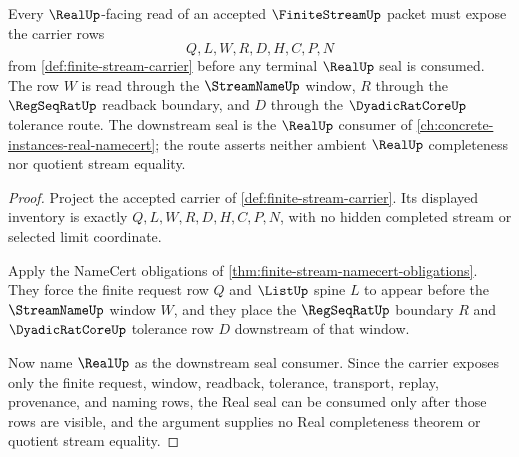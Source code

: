 \begin{theorem}
\label{thm:finite-stream-real-seal-dependency-route}
Every $\RealUp$-facing read of an accepted $\FiniteStreamUp$ packet must expose the carrier rows
$$
Q,L,W,R,D,H,C,P,N
$$
from \autoref{def:finite-stream-carrier} before any terminal $\RealUp$ seal is consumed. The row $W$ is read through the $\StreamNameUp$ window, $R$ through the $\RegSeqRatUp$ readback boundary, and $D$ through the $\DyadicRatCoreUp$ tolerance route. The downstream seal is the $\RealUp$ consumer of \autoref{ch:concrete-instances-real-namecert}; the route asserts neither ambient $\RealUp$ completeness nor quotient stream equality.
\end{theorem}
\begin{proof}
Project the accepted carrier of \autoref{def:finite-stream-carrier}. Its displayed inventory is exactly $Q,L,W,R,D,H,C,P,N$, with no hidden completed stream or selected limit coordinate.

Apply the NameCert obligations of \autoref{thm:finite-stream-namecert-obligations}. They force the finite request row $Q$ and $\ListUp$ spine $L$ to appear before the $\StreamNameUp$ window $W$, and they place the $\RegSeqRatUp$ boundary $R$ and $\DyadicRatCoreUp$ tolerance row $D$ downstream of that window.

Now name $\RealUp$ as the downstream seal consumer. Since the carrier exposes only the finite request, window, readback, tolerance, transport, replay, provenance, and naming rows, the Real seal can be consumed only after those rows are visible, and the argument supplies no Real completeness theorem or quotient stream equality.
\end{proof}

